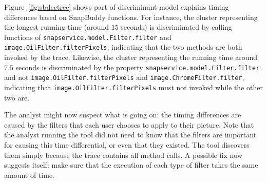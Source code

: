 \documentclass{article}
\begin{document}
Figure~\ref{fig:sbdectree} shows part of discriminant model explains timing differences
based on SnapBuddy functions. 
For instance, the cluster representing the longest running time (around $15$ seconds) is
discriminated by calling functions of \texttt{snapservice.model.Filter.filter} and 
\texttt{image.OilFilter.filterPixels}, indicating that the two methods
are both invoked by the trace. Likewise, the cluster representing the
running time around $7.5$ seconds is discriminated by the
property \texttt{snapservice.model.Filter.filter} and
not \texttt{image.OilFilter.filterPixels} and
\texttt{image.ChromeFilter.filter}, indicating that
\texttt{image.OilFilter.filterPixels} must not invoked
while the other two are.

The analyst might now suspect what is going on: the timing
differences are caused by the filters that each user chooses to apply
to their picture. %
Note that the analyst running the tool did not need to
know that the filters are important for causing this time differential, or even that
they existed. The tool discovers them simply because the trace
contains all method calls. A possible fix now suggests itself:
make sure that the execution of
each type of filter takes the same amount of time.
\end{document}
